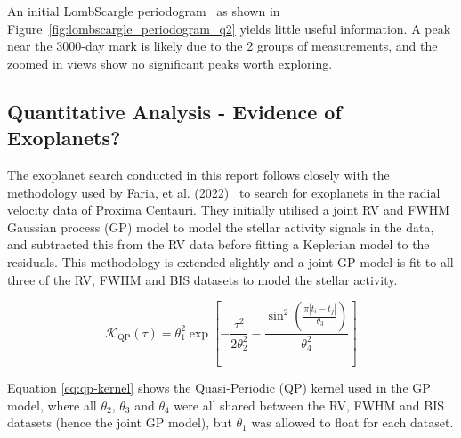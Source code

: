 An initial LombScargle periodogram~\cite{lomb, scargle} as shown in Figure~\eqref{fig:lombscargle_periodogram_q2} yields
little useful information.
A peak near the 3000-day mark is likely due to the 2 groups of measurements, and the zoomed in views show no significant
peaks worth exploring.

\subsection{Quantitative Analysis - Evidence of Exoplanets?}\label{subsec:q2-quantitative-analysis}
The exoplanet search conducted in this report follows closely with the methodology used by Faria, et al. (2022)~\cite{faria2022}
to search for exoplanets in the radial velocity data of Proxima Centauri.
They initially utilised a joint RV and FWHM Gaussian process (GP) model to model the stellar activity signals in the data,
and subtracted this from the RV data before fitting a Keplerian model to the residuals.
This methodology is extended slightly and a joint GP model is fit to all three of the RV, FWHM and BIS datasets to model
the stellar activity.

\begin{equation}\label{eq:qp-kernel}
    \mathcal{K}_{\text{QP}}(\tau) =
    \theta_1^2 \exp
    \left[
        -\frac{\tau^2}{2 \theta_2^2} - \frac{\sin^2 \left( \frac{\pi |t_{i} - t_{j}|}{\theta_3} \right)}{\theta_4^2}
    \right]
\end{equation}

Equation \eqref{eq:qp-kernel} shows the Quasi-Periodic (QP) kernel used in the GP model, where all $\theta_{2}$, $\theta_{3}$ and
$\theta_{4}$ were all shared between the RV, FWHM and BIS datasets (hence the joint GP model), but $\theta_{1}$ was allowed
to float for each dataset.

